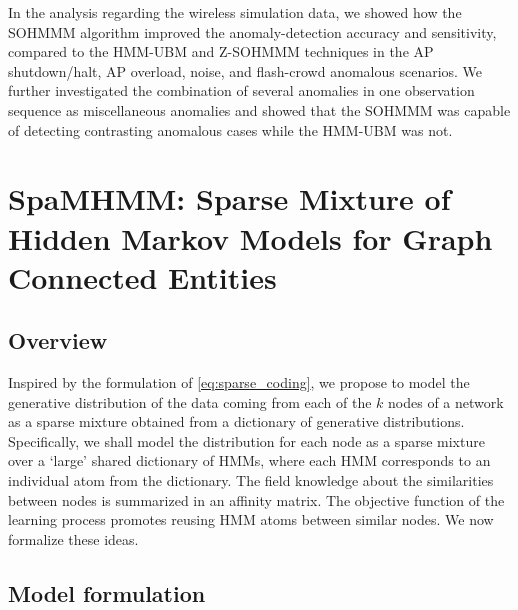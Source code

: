 In the analysis regarding the wireless simulation data, we showed how the SOHMMM algorithm improved the anomaly-detection accuracy and sensitivity, compared to the HMM-UBM and Z-SOHMMM techniques in the AP shutdown/halt, AP overload, noise, and flash-crowd anomalous scenarios. We further investigated the combination of several anomalies in one observation sequence as miscellaneous anomalies and showed that the SOHMMM was capable of detecting contrasting anomalous cases while the HMM-UBM was not. 

\section{SpaMHMM: Sparse Mixture of Hidden Markov Models for Graph Connected Entities}
\label{sec:spamhmm}

\subsection{Overview}

Inspired by the formulation of \eqref{eq:sparse_coding}, we propose to model the generative distribution of the data coming from each of the $k$ nodes of a network as a sparse mixture obtained from a dictionary of generative distributions. Specifically, we shall model the distribution for each node as a sparse mixture over a `large' shared dictionary of HMMs, where each HMM corresponds to an individual atom from the dictionary.
The field knowledge about the similarities between nodes is summarized in an affinity matrix. The objective function of the learning process promotes reusing HMM atoms between similar nodes.
We now formalize these ideas.

\subsection{Model formulation}
